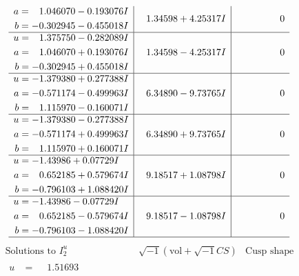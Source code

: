\documentclass[1p]{elsarticle_modified}
\theoremstyle{definition}
\newcommand{\I}{\sqrt{-1}}
\begin{document}
$$\begin{array}{c|c|c}
\begin{aligned}
a &= \phantom{-}1.046070 - 0.193076 I \\
b &= -0.302945 - 0.455018 I\end{aligned}
 & \phantom{-}1.34598 + 4.25317 I & \phantom{-0.000000 } 0 \\ \hline\begin{aligned}
u &= \phantom{-}1.375750 - 0.282089 I \\
a &= \phantom{-}1.046070 + 0.193076 I \\
b &= -0.302945 + 0.455018 I\end{aligned}
 & \phantom{-}1.34598 - 4.25317 I & \phantom{-0.000000 } 0 \\ \hline\begin{aligned}
u &= -1.379380 + 0.277388 I \\
a &= -0.571174 - 0.499963 I \\
b &= \phantom{-}1.115970 - 0.160071 I\end{aligned}
 & \phantom{-}6.34890 - 9.73765 I & \phantom{-0.000000 } 0 \\ \hline\begin{aligned}
u &= -1.379380 - 0.277388 I \\
a &= -0.571174 + 0.499963 I \\
b &= \phantom{-}1.115970 + 0.160071 I\end{aligned}
 & \phantom{-}6.34890 + 9.73765 I & \phantom{-0.000000 } 0 \\ \hline\begin{aligned}
u &= -1.43986 + 0.07729 I \\
a &= \phantom{-}0.652185 + 0.579674 I \\
b &= -0.796103 + 1.088420 I\end{aligned}
 & \phantom{-}9.18517 + 1.08798 I & \phantom{-0.000000 } 0 \\ \hline\begin{aligned}
u &= -1.43986 - 0.07729 I \\
a &= \phantom{-}0.652185 - 0.579674 I \\
b &= -0.796103 - 1.088420 I\end{aligned}
 & \phantom{-}9.18517 - 1.08798 I & \phantom{-0.000000 } 0\\
 \hline 
 \end{array}$$\newpage$$\begin{array}{c|c|c}  
\text{Solutions to }I^u_{2}& \I (\text{vol} + \sqrt{-1}CS) & \text{Cusp shape}\\
 \hline 
\begin{aligned}
u &= \phantom{-}1.51693\phantom{ +0.000000I} \\

\end{aligned}
\end{array}$$
\end{document}
